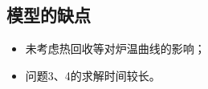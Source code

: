 \documentclass[withoutpreface,bwprint]{cumcmthesis} %
\begin{document}
	\subsection{模型的缺点}
	\begin{itemize}
		\item 未考虑热回收等对炉温曲线的影响；
		\item 问题3、4的求解时间较长。
	\end{itemize}
	
	
	\nocite{*}
	
	
	
\end{document}
